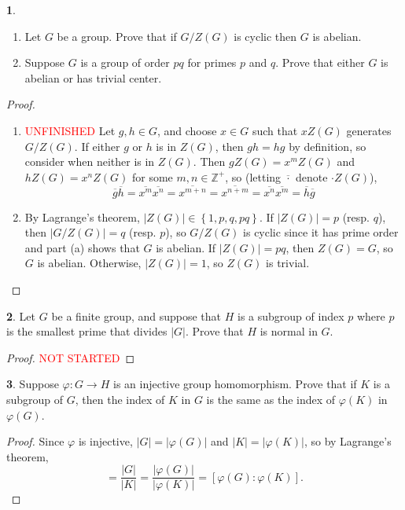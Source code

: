 \documentclass[12pt]{article}
\theoremstyle{definition}
\newtheorem{ex}{}
\begin{document}
\begin{ex}\
	\begin{enumerate}[label=(\alph*)]
		\item Let $G$ be a group.
		      Prove that if $G/Z(G)$ is cyclic then $G$ is abelian.
		\item Suppose $G$ is a group of order $pq$ for primes $p$ and $q$.
		      Prove that either $G$ is abelian or has trivial center.
	\end{enumerate}
\end{ex}
\begin{proof}\
	\begin{enumerate}[label=(\alph*)]
		\item \textcolor{red}{UNFINISHED} Let $g, h \in G$, and choose $x \in G$ such that $xZ(G)$ generates $G/Z(G)$.
		      If either $g$ or $h$ is in $Z(G)$, then $gh = hg$ by definition, so consider when neither is in $Z(G)$.
		      Then $gZ(G) = x^mZ(G)$ and $hZ(G) = x^nZ(G)$ for some $m, n \in \mathbb{Z}^+$, so (letting $\overline{\cdot}$ denote $\cdot Z(G)$), \begin{equation*}
			      \overline{g}\overline{h} = \overline{x^m }\overline{x^n} = \overline{x^{m+n}} = \overline{x^{n + m }} = \overline{x^n}\overline{x^m } = \overline{h}\overline{g}
		      \end{equation*}
		\item By Lagrange's theorem, $|Z(G)| \in \left\lbrace 1, p, q, pq \right\rbrace$.
		      If $|Z(G)| = p$ (resp. $q$), then $|G/Z(G)| = q$ (resp. $p$), so $G/Z(G)$ is cyclic since it has prime order and part (a) shows that $G$ is abelian.
		      If $|Z(G)| = pq$, then $Z(G) = G$, so $G$ is abelian.
		      Otherwise, $|Z(G)| = 1$, so $Z(G)$ is trivial.
	\end{enumerate}
\end{proof}

\begin{ex}
	Let $G$ be a finite group, and suppose that $H$ is a subgroup of index $p$ where $p$ is the smallest prime that divides $|G|$.
	Prove that $H$ is normal in $G$.
\end{ex}
\begin{proof}
	\textcolor{red}{NOT STARTED}
\end{proof}

\begin{ex}
	Suppose $\varphi : G \to H$ is an injective group homomorphism.
	Prove that if $K$ is a subgroup of $G$, then the index of $K$ in $G$ is the same as the index of $\varphi(K)$ in $\varphi(G)$.
\end{ex}
\begin{proof}
	Since $\varphi$ is injective, $|G| = |\varphi(G)|$ and $|K| = |\varphi(K)|$, so by Lagrange's theorem, \begin{equation*}
    [G : K] = \frac{|G|}{|K|} = \frac{|\varphi(G)|}{|\varphi(K)|} = [\varphi(G) : \varphi(K)].
  \end{equation*}
\end{proof}
\end{document}
